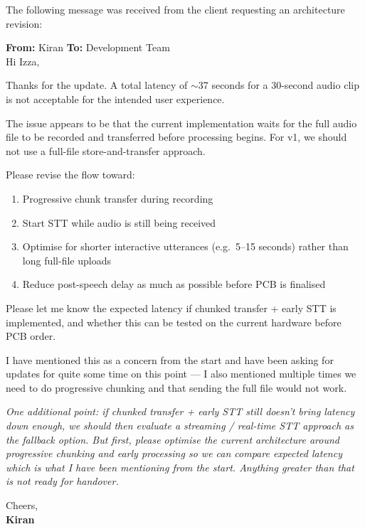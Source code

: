 \documentclass[12pt,a4paper]{article}
\begin{document}
The following message was received from the client requesting an architecture revision:

\begin{clientbox}
\textbf{From:} Kiran \hfill \textbf{To:} Development Team\\[6pt]
Hi Izza,

Thanks for the update. A total latency of $\sim$37 seconds for a 30-second audio clip is not
acceptable for the intended user experience.

The issue appears to be that the current implementation waits for the full audio file to be
recorded and transferred before processing begins. For v1, we should not use a full-file
store-and-transfer approach.

Please revise the flow toward:

\begin{enumerate}[leftmargin=1.5em]
  \item Progressive chunk transfer during recording
  \item Start STT while audio is still being received
  \item Optimise for shorter interactive utterances (e.g.\ 5--15 seconds) rather than long
        full-file uploads
  \item Reduce post-speech delay as much as possible before PCB is finalised
\end{enumerate}

Please let me know the expected latency if chunked transfer + early STT is implemented, and
whether this can be tested on the current hardware before PCB order.

I have mentioned this as a concern from the start and have been asking for updates for quite
some time on this point — I also mentioned multiple times we need to do progressive chunking
and that sending the full file would not work.

\medskip
\textit{One additional point: if chunked transfer + early STT still doesn't bring latency down
enough, we should then evaluate a streaming / real-time STT approach as the fallback option.
But first, please optimise the current architecture around progressive chunking and early
processing so we can compare expected latency which is what I have been mentioning from the
start. Anything greater than that is not ready for handover.}

\medskip
Cheers,\\
\textbf{Kiran}
\end{clientbox}
\end{document}
